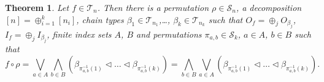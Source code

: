 \documentclass[12pt]{article}
\newtheorem{theorem}{Theorem}
\theoremstyle{definition}
\theoremstyle{remark}
\def\Te{\mathcal T}
\def\permut{\mathscr{S}}
\def\vtl{\vartriangleleft}
\begin{document}
\begin{theorem}\label{thm:structure}
Let  $f\in \Te_n$. Then there is a permutation $\rho\in \permut_n$, a decomposition
$[n]=\oplus_{i=1}^k[n_i]$, chain types 
$\beta_1\in \Te_{n_1}$,\dots, $\beta_k\in
\Te_{n_k}$ such that $O_f=\oplus_j O_{\beta_j}$, $I_f=\oplus_j I_{\beta_j}$, finite index sets $A$, $B$ and permutations $\pi_{a,b}\in
\permut_k$, $a\in A$, $b\in B$ such that 
\[
f\circ\rho =\bigvee_{a\in A}\bigwedge_{b\in B} (\beta_{\pi^{-1}_{a,b}(1)}\vtl \dots \vtl
\beta_{\pi^{-1}_{a,b}(k)})=\bigwedge_{b\in B}\bigvee_{a\in A}(\beta_{\pi^{-1}_{a,b}(1)}\vtl \dots \vtl
\beta_{\pi^{-1}_{a,b}(k)}).
\]
%
\end{theorem}
\end{document}
